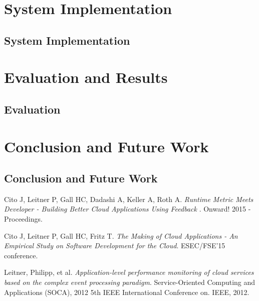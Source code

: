 \documentclass[article,type=msc,colorback,accentcolor=tud7b]{tudthesis}
\begin{document}
 \cleardoublepage
 \section{System Implementation}
 \subsection{System Implementation}

 \cleardoublepage	  
 \section{Evaluation and Results}	  
 \subsection{Evaluation}
 
 \cleardoublepage
 \section{Conclusion and Future Work}	  
 \subsection{Conclusion and Future Work}

\clearpage
	  



\begin{thebibliography}{1}
\bibitem{}
	Cito J, Leitner P, Gall HC, Dadashi A, Keller A, Roth A.
	\emph { Runtime Metric Meets Developer - Building Better Cloud Applications Using Feedback }. 
	Onward! 2015 - Proceedings.
	
	Cito J, Leitner P, Gall HC, Fritz T.
	\emph { The Making of Cloud Applications - An Empirical Study on
Software Development for the Cloud}. 
	ESEC/FSE'15 conference.
	
	Leitner, Philipp, et al. 
	\emph { Application-level performance monitoring of cloud services based on the complex event processing paradigm}. 
	Service-Oriented Computing and Applications (SOCA), 2012 5th IEEE International Conference on. IEEE, 2012.
	
 	
	
	
\end{thebibliography}	  
\end{document}
